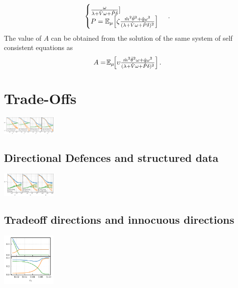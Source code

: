 \documentclass[a0paper,fleqn]{betterportraitposter}
\theoremstyle{plain}
\theoremstyle{definition}
\theoremstyle{remark}
\begin{document}
{\begin{multicols}{3}
\begin{equation}
\begin{cases}
            \frac{\omega}{\lambda + \hat{V} \omega + \hat{P} \delta } 
        ] \\
        P = \mathbb{E}_{\mu} \qty[ 
            \zeta \frac{
                \hat{m}^2 \bar{\theta}^2 + \hat{q} \omega^2
            }{
                (\lambda + \hat{V} \omega + \hat{P} \delta)^2
            } 
        ] 
    \end{cases}\,.
\end{equation}
The value of \(A\) can be obtained from the solution of the same system of self consistent equations as
\begin{equation}
    A = \! \mathbb{E}_{\mu} \! \qty[ 
    {\textstyle
        \upsilon \frac{\hat{m}^2 \bar{\theta}^2 \omega + \hat{q} \omega^2}{(\lambda + \hat{V} \omega + \hat{P} \delta)^2} 
    }
    ] \,.
\end{equation}

\columnbreak

\section{Trade-Offs}


\includegraphics[width=0.2\textwidth]{Assets/feature_combinations_alpha_sweep.pdf}


\subsection{Directional Defences and structured data}

\includegraphics[width=0.2\textwidth]{Assets/defence_sweep.pdf}


\subsection{Tradeoff directions and innocuous directions}


\includegraphics[width=0.2\textwidth]{Assets/optimal_defense.pdf}



\end{multicols}}
\end{document}
